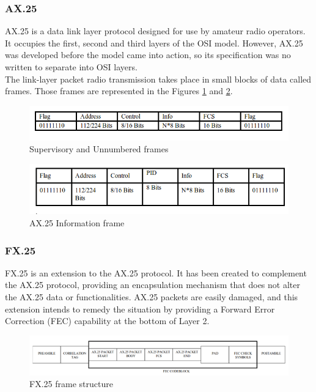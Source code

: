 \pagebreak

\subsubsection{AX.25}
AX.25 is a data link layer protocol designed for use by amateur radio operators. It occupies the first, second and third layers of the OSI model. However, AX.25 was developed before the model came into action, so its specification was no written to separate into OSI layers.\\

The link-layer packet radio transmission takes place in small blocks of data called frames. Those frames are represented in the Figures \ref{f3.3} and \ref{f3.4}.\\

 \begin{figure}[H]
\centerline{\includegraphics[width=1\textwidth]{images/ax25a.png}}
\caption{Supervisory and Unnumbered frames \cite{AX25}}
\label{f3.3}
\end{figure}

\begin{figure}[H]
\centerline{\includegraphics[width=1\textwidth]{images/ax25b.png}}
\caption{AX.25 Information frame \cite{AX25}}
\label{f3.4}
\end{figure}

\subsubsection{FX.25}
FX.25 is an extension to the AX.25 protocol. It has been created to complement the AX.25 protocol, providing an encapsulation mechanism that does not alter the AX.25 data or functionalities. AX.25 packets are easily damaged, and this extension intends to remedy the situation by providing a Forward Error Correction (FEC) capability at the bottom of Layer 2.

\begin{figure}[H]
\centerline{\includegraphics[width=1\textwidth]{images/fx25.png}}
\caption{FX.25 frame structure \cite{FX25}}
\label{f3.5}
\end{figure}

\newpage

\newpage
